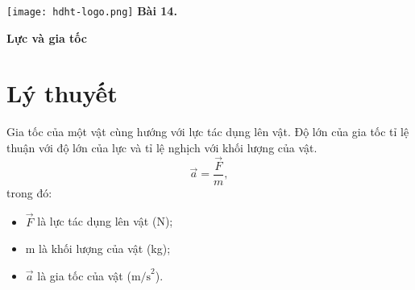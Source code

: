 \newcommand{\chapter}[2][]{
	\newcommand{\chapname}{#2}
	\begin{flushleft}
		\begin{minipage}[t]{\linewidth}
			\texttt{[image: hdht-logo.png]}
			\hspace{0pt}	
			\sffamily\bfseries\large Bài  14.
			\begin{flushleft}
				\huge\bfseries #1
			\end{flushleft}
		\end{minipage}
	\end{flushleft}
	\vspace{1cm}
	\normalfont\normalsize
}
\chapter[Lực và gia tốc]{Lực và gia tốc}
\section{Lý thuyết}

Gia tốc của một vật cùng hướng với lực tác dụng lên vật. Độ lớn của gia tốc tỉ lệ thuận với độ lớn của lực và tỉ lệ nghịch với khối lượng của vật.
\begin{equation*}
	\vec{a}=\dfrac{\vec F}{m},
\end{equation*}
trong đó:
\begin{itemize}
	\item $\vec F$ là lực tác dụng lên vật (N);
	\item m là khối lượng của vật (kg);
	\item $\vec a$ là gia tốc của vật ($\text{m/s}^2$).
\end{itemize}
